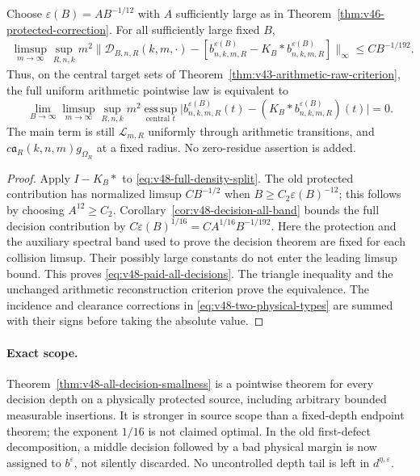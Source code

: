 \begin{theorem}
\label{thm:v48-two-source-reduction}
Choose $\varepsilon(B)=A B^{-1/12}$ with $A$ sufficiently large as in
Theorem~\ref{thm:v46-protected-correction}. For all sufficiently large
fixed $B$,
\begin{align}
 \limsup_{m\to\infty}\sup_{R,n,k}m^2
 \bigl\|\mathscr D_{B,n,R}(k,m,\cdot)
      -[b^{\varepsilon(B)}_{n,k,m,R}
                     -K_B*b^{\varepsilon(B)}_{n,k,m,R}]\bigr\|_\infty
                                  \le C B^{-1/192}.
                                      \label{eq:v48-paid-all-decisions}
\end{align}
Thus, on the central target sets of
Theorem~\ref{thm:v43-arithmetic-raw-criterion}, the full uniform
arithmetic pointwise law is equivalent to
\begin{equation}\label{eq:v48-physical-residual-criterion}
 \lim_{B\to\infty}\limsup_{m\to\infty}\sup_{R,n,k}
 m^2\operatorname*{ess\,sup}_{\text{central }t}
 \bigl|b^{\varepsilon(B)}_{n,k,m,R}(t)
              -(K_B*b^{\varepsilon(B)}_{n,k,m,R})(t)\bigr|=0.
\end{equation}
The main term is still $\mathcal L_{m,R}$ uniformly through arithmetic
transitions, and $c\mathfrak a_R(k,n,m)g_{\Omega_R}$ at a fixed radius.
No zero-residue assertion is added.
\end{theorem}
\begin{proof}
Apply $I-K_B*$ to \eqref{eq:v48-full-density-split}.
The old protected contribution has normalized limsup $CB^{-1/2}$
when $B\ge C_2\varepsilon(B)^{-12}$; this follows by choosing
$A^{12}\ge C_2$. Corollary~\ref{cor:v48-decision-all-band} bounds
the full decision contribution by $C\varepsilon(B)^{1/16}
=CA^{1/16}B^{-1/192}$. Here the protection and the auxiliary spectral
band used to prove the decision theorem are fixed for each collision
limsup. Their possibly large constants do not enter the leading
limsup bound. This proves \eqref{eq:v48-paid-all-decisions}.
The triangle inequality and the unchanged arithmetic reconstruction
criterion prove the equivalence. The incidence and clearance
corrections in \eqref{eq:v48-two-physical-types} are summed with their
signs before taking the absolute value.
\end{proof}

\paragraph{Exact scope.}
Theorem~\ref{thm:v48-all-decision-smallness} is a pointwise theorem
for every decision depth on a physically protected source, including
arbitrary bounded measurable insertions. It is stronger in source
scope than a fixed-depth endpoint theorem; the exponent $1/16$ is
not claimed optimal. In the old first-defect decomposition, a middle
decision followed by a bad physical margin is now assigned to
$b^\varepsilon$, not silently discarded. No uncontrolled depth tail
is left in $d^{\eta,\varepsilon}$.


